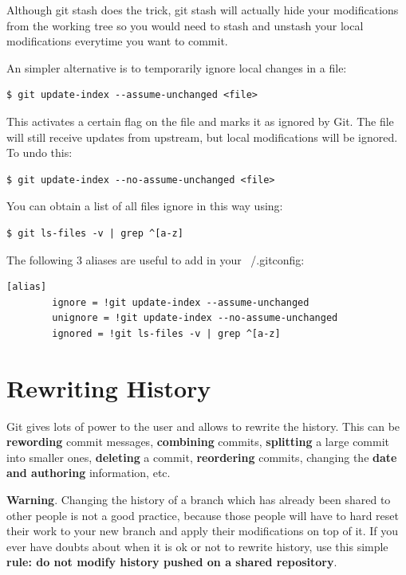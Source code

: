 \documentclass{../common/tufte-latex/tufte-handout}
\begin{document}
Although git stash does the trick, git stash will actually hide your modifications from the working tree so you would need to stash and unstash your local modifications everytime you want to commit.

An simpler alternative is to temporarily ignore local changes in a file:
\begin{lstlisting}[style=BashInputStyle]
  $ git update-index --assume-unchanged <file>
\end{lstlisting}

This activates a certain flag on the file and marks it as ignored by Git.
The file will still receive updates from upstream, but local modifications will be ignored.
To undo this:

\begin{lstlisting}[style=BashInputStyle]
  $ git update-index --no-assume-unchanged <file>
\end{lstlisting}

You can obtain a list of all files ignore in this way using:

\begin{lstlisting}[style=BashInputStyle]
  $ git ls-files -v | grep ^[a-z]
\end{lstlisting}

The following 3 aliases are useful to add in your ~/.gitconfig:

\begin{lstlisting}[style=BashInputStyle]
[alias]
        ignore = !git update-index --assume-unchanged 
        unignore = !git update-index --no-assume-unchanged
        ignored = !git ls-files -v | grep ^[a-z]
\end{lstlisting}

\section{Rewriting History}
Git gives lots of power to the user and allows to rewrite the history.
This can be \textbf{rewording} commit messages, \textbf{combining} commits, \textbf{splitting} a large commit into smaller ones, \textbf{deleting} a commit, \textbf{reordering} commits, changing the \textbf{date and authoring} information, etc.

\noindent \textbf{Warning}. Changing the history of a branch which has already been shared to other people is not a good practice, because those people will have to hard reset their work to your new branch and apply their modifications on top of it.
If you ever have doubts about when it is ok or not to rewrite history, use this simple \textbf{rule: do not modify history pushed on a shared repository}.
\end{document}
